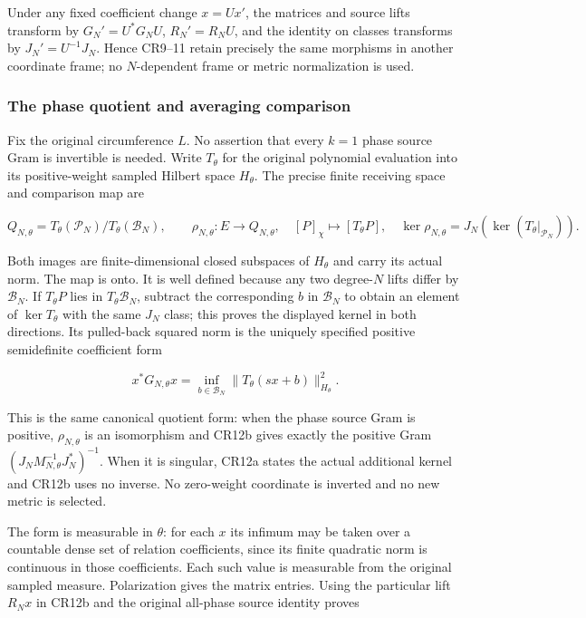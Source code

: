 Under any fixed coefficient change \(x=Ux'\), the matrices and source lifts transform by \(G_N'=U^*G_NU\), \(R_N'=R_NU\), and the identity on classes transforms by \(J_N'=U^{-1}J_N\). Hence CR9--11 retain precisely the same morphisms in another coordinate frame; no \(N\)-dependent frame or metric normalization is used.

\subsubsection{The phase quotient and averaging comparison}\label{the-phase-quotient-and-averaging-comparison}

Fix the original circumference \(L\). No assertion that every \(k=1\) phase source Gram is invertible is needed. Write \(T_\theta\) for the original polynomial evaluation into its positive-weight sampled Hilbert space \(H_\theta\). The precise finite receiving space and comparison map are

\[
Q_{N,\theta}=T_\theta(\mathcal P_N)/T_\theta(\mathcal B_N),\qquad
\rho_{N,\theta}:E\longrightarrow Q_{N,\theta},\quad
[P]_\chi\longmapsto[T_\theta P],\quad
\ker\rho_{N,\theta}=J_N(\ker(T_\theta|_{\mathcal P_N})).
\tag{CR12a}
\]

Both images are finite-dimensional closed subspaces of \(H_\theta\) and carry its actual norm. The map is onto. It is well defined because any two degree-\(N\) lifts differ by \(\mathcal B_N\). If \(T_\theta P\) lies in \(T_\theta\mathcal B_N\), subtract the corresponding \(b\) in \(\mathcal B_N\) to obtain an element of \(\ker T_\theta\) with the same \(J_N\) class; this proves the displayed kernel in both directions. Its pulled-back squared norm is the uniquely specified positive semidefinite coefficient form

\[
x^*G_{N,\theta}x
=\inf_{b\in\mathcal B_N}\|T_\theta(sx+b)\|_{H_\theta}^2.
\tag{CR12b}
\]

This is the same canonical quotient form: when the phase source Gram is positive, \(\rho_{N,\theta}\) is an isomorphism and CR12b gives exactly the positive Gram \((J_NM_{N,\theta}^{-1}J_N^*)^{-1}\). When it is singular, CR12a states the actual additional kernel and CR12b uses no inverse. No zero-weight coordinate is inverted and no new metric is selected.

The form is measurable in \(\theta\): for each \(x\) its infimum may be taken over a countable dense set of relation coefficients, since its finite quadratic norm is continuous in those coefficients. Each such value is measurable from the original sampled measure. Polarization gives the matrix entries. Using the particular lift \(R_Nx\) in CR12b and the original all-phase source identity proves

